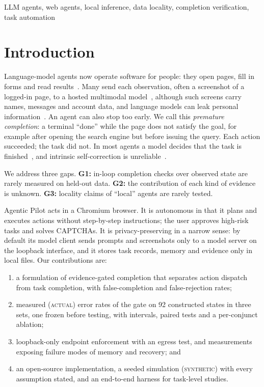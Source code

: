 \documentclass[conference]{IEEEtran}
\newcommand{\status}[1]{\textsc{#1}}
\begin{document}
\begin{IEEEkeywords}
LLM agents, web agents, local inference, data locality, completion verification, task automation
\end{IEEEkeywords}

\section{Introduction}

Language-model agents now operate software for people: they open pages, fill in forms and read results~\cite{zhou2024webarena,he2024webvoyager,xie2024osworld}. Many send each observation, often a screenshot of a logged-in page, to a hosted multimodal model~\cite{he2024webvoyager,zheng2024seeact,zhang2025ufo}, although such screens carry names, messages and account data, and language models can leak personal information~\cite{lukas2023pii}. An agent can also stop too early. We call this \emph{premature completion}: a terminal ``done'' while the page does not satisfy the goal, for example after opening the search engine but before issuing the query. Each action succeeded; the task did not. In most agents a model decides that the task is finished~\cite{yao2023react,shinn2023reflexion}, and intrinsic self-correction is unreliable~\cite{huang2024cannot}.

We address three gaps. \textbf{G1:} in-loop completion checks over observed state are rarely measured on held-out data. \textbf{G2:} the contribution of each kind of evidence is unknown. \textbf{G3:} locality claims of ``local'' agents are rarely tested.

Agentic Pilot acts in a Chromium browser. It is autonomous in that it plans and executes actions without step-by-step instructions; the user approves high-risk tasks and solves CAPTCHAs. It is privacy-preserving in a narrow sense: by default its model client sends prompts and screenshots only to a model server on the loopback interface, and it stores task records, memory and evidence only in local files. Our contributions are:
\begin{enumerate}
\item a formulation of evidence-gated completion that separates action dispatch from task completion, with false-completion and false-rejection rates;
\item measured (\status{actual}) error rates of the gate on 92 constructed states in three sets, one frozen before testing, with intervals, paired tests and a per-conjunct ablation;
\item loopback-only endpoint enforcement with an egress test, and measurements exposing failure modes of memory and recovery; and
\item an open-source implementation, a seeded simulation (\status{synthetic}) with every assumption stated, and an end-to-end harness for task-level studies.
\end{enumerate}
\end{document}
